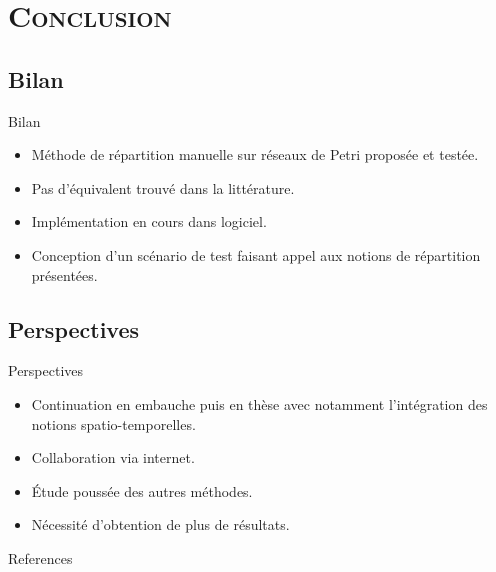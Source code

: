 \section{\scshape Conclusion}
\subsection*{Bilan}
\begin{frame}{Bilan}
	\begin{itemize}
	\item Méthode de répartition manuelle sur réseaux de Petri proposée et testée.
	
	\item Pas d'équivalent trouvé dans la littérature.
	
	\item Implémentation en cours dans logiciel.
	
	\item Conception d'un scénario de test faisant appel aux notions de répartition présentées.		
	\end{itemize}
\end{frame}

\subsection*{Perspectives}
\begin{frame}{Perspectives}
	\begin{itemize}
		\item Continuation en embauche puis en thèse avec notamment l'intégration des notions spatio-temporelles.
			
		\item Collaboration via internet.
			
		\item Étude poussée des autres méthodes.
			
		\item Nécessité d'obtention de plus de résultats.
	\end{itemize}
\end{frame}


{\small
\begin{frame}[allowframebreaks]{References}
	
	
	
	
\end{frame}
}